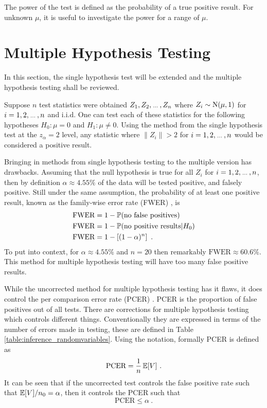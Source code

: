 The power of the test is defined as the probability of a true positive result. For unknown $\mu$, it is useful to investigate the power for a range of $\mu$.

\section{Multiple Hypothesis Testing}

In this section, the single hypothesis test will be extended and the multiple hypothesis testing \citep{shaffer1995multiple, dudoit2003multiple} shall be reviewed.

Suppose $n$ test statistics were obtained $Z_1,Z_2,\dotdotdot,Z_n$ where $Z_i\sim\operatorname{N}(\mu,1)$ for $i=1,2,\dotdotdot,n$ and i.i.d. One can test each of these statistics for the following hypotheses $H_0:\mu=0$ and $H_1:\mu\neq 0$. Using the method from the single hypothesis test at the $z_\alpha=2$ level, any statistic where $\|Z_i\|>2$ for $i=1,2,\dotdotdot,n$ would be considered a positive result.

Bringing in methods from single hypothesis testing to the multiple version has drawbacks. Assuming that the null hypothesis is true for all $Z_i$ for $i=1,2,\dotdotdot,n$, then by definition $\alpha\approx 4.55\%$ of the data will be tested positive, and falsely positive. Still under the same assumption, the probability of at least one positive result, known as the family-wise error rate (FWER) \citep{shaffer1995multiple}, is
\begin{align}
    \text{FWER}&=1-\operatorname{\mathbb{P}}(\text{no false positives}) \nonumber\\
    \text{FWER}&=1-\operatorname{\mathbb{P}}(\text{no positive results}|H_0) \nonumber\\
    \text{FWER}&=1-\left[(1-\alpha)^n\right] \label{eq:inference_fwer}\ .
\end{align}
To put into context, for $\alpha\approx 4.55\%$ and $n=20$ then remarkably $\text{FWER}\approx60.6\%$. This method for multiple hypothesis testing will have too many false positive results.

While the uncorrected method for multiple hypothesis testing has it flaws, it does control the per comparison error rate (PCER) \citep{benjamini1995controlling}. PCER is the proportion of false positives out of all tests. There are corrections for multiple hypothesis testing which controls different things. Conventionally they are expressed in terms of the number of errors made in testing, these are defined in Table \ref{table:inference_randomvariables}. Using the notation, formally PCER is defined as
\begin{equation}
    \text{PCER}=
    \dfrac{
        1
    }
    {
        n
    }
    \operatorname{\mathbb{E}}[V]
    \ .
\end{equation}
It can be seen that if the uncorrected test controls the false positive rate such that $\operatorname{\mathbb{E}}[V]/n_0 = \alpha$, then it controls the PCER such that
\begin{equation}
    \text{PCER}\leqslant\alpha \ .
\end{equation}

